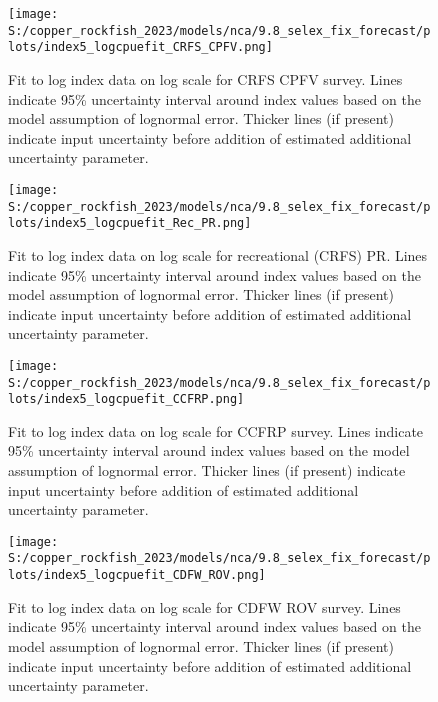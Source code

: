 \documentclass[11pt,
  english,
  letterpaper,
]{article}
\begin{document}
\pagebreak

\begin{figure}
\centering
\texttt{[image: S:/copper\_rockfish\_2023/models/nca/9.8\_selex\_fix\_forecast/plots/index5\_logcpuefit\_CRFS\_CPFV.png]}
\caption{Fit to log index data on log scale for CRFS CPFV survey. Lines indicate 95\% uncertainty interval around index values based on the model assumption of lognormal error. Thicker lines (if present) indicate input uncertainty before addition of estimated additional uncertainty parameter.\label{fig:crfs-cpfv-index-fit}}
\end{figure}

\pagebreak

\begin{figure}
\centering
\texttt{[image: S:/copper\_rockfish\_2023/models/nca/9.8\_selex\_fix\_forecast/plots/index5\_logcpuefit\_Rec\_PR.png]}
\caption{Fit to log index data on log scale for recreational (CRFS) PR. Lines indicate 95\% uncertainty interval around index values based on the model assumption of lognormal error. Thicker lines (if present) indicate input uncertainty before addition of estimated additional uncertainty parameter.\label{fig:crfs-pr-index-fit}}
\end{figure}

\pagebreak

\begin{figure}
\centering
\texttt{[image: S:/copper\_rockfish\_2023/models/nca/9.8\_selex\_fix\_forecast/plots/index5\_logcpuefit\_CCFRP.png]}
\caption{Fit to log index data on log scale for CCFRP survey. Lines indicate 95\% uncertainty interval around index values based on the model assumption of lognormal error. Thicker lines (if present) indicate input uncertainty before addition of estimated additional uncertainty parameter.\label{fig:ccfrp-index-fit}}
\end{figure}

\pagebreak

\begin{figure}
\centering
\texttt{[image: S:/copper\_rockfish\_2023/models/nca/9.8\_selex\_fix\_forecast/plots/index5\_logcpuefit\_CDFW\_ROV.png]}
\caption{Fit to log index data on log scale for CDFW ROV survey. Lines indicate 95\% uncertainty interval around index values based on the model assumption of lognormal error. Thicker lines (if present) indicate input uncertainty before addition of estimated additional uncertainty parameter.\label{fig:rov-index-fit}}
\end{figure}
\end{document}
